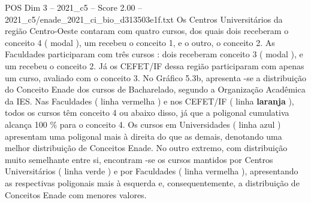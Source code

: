 \begin{textsample}{POS Dim 3 – 2021\_c5 – Score 2.00 – 2021\_c5/enade\_2021\_ci\_bio\_d313503e1f.txt}
Os Centros Universitários da região Centro-Oeste contaram com quatro cursos, dos quais dois receberam o conceito 4 ( modal ), um recebeu o conceito 1, e o outro, o conceito 2.
As Faculdades participaram com três cursos : dois receberam conceito 3 ( modal ), e um recebeu o conceito 2.
Já os CEFET/IF dessa região participaram com apenas um curso, avaliado com o conceito 3.
No Gráfico 5.3b, apresenta -se a distribuição do Conceito Enade dos cursos de Bacharelado, segundo a Organização Acadêmica da IES.
Nas Faculdades ( linha vermelha ) e nos CEFET/IF ( linha \textbf{laranja} ), todos os cursos têm conceito 4 ou abaixo disso, já que a poligonal cumulativa alcança 100 \% para o conceito 4.
Os cursos em Universidades ( linha azul ) apresentam uma poligonal mais à direita do que as demais, denotando uma melhor distribuição de Conceitos Enade.
No outro extremo, com distribuição muito semelhante entre si, encontram -se os cursos mantidos por Centros Universitários ( linha verde ) e por Faculdades ( linha vermelha ), apresentando as respectivas poligonais mais à esquerda e, consequentemente, a distribuição de Conceitos Enade com menores valores.

\end{textsample}
